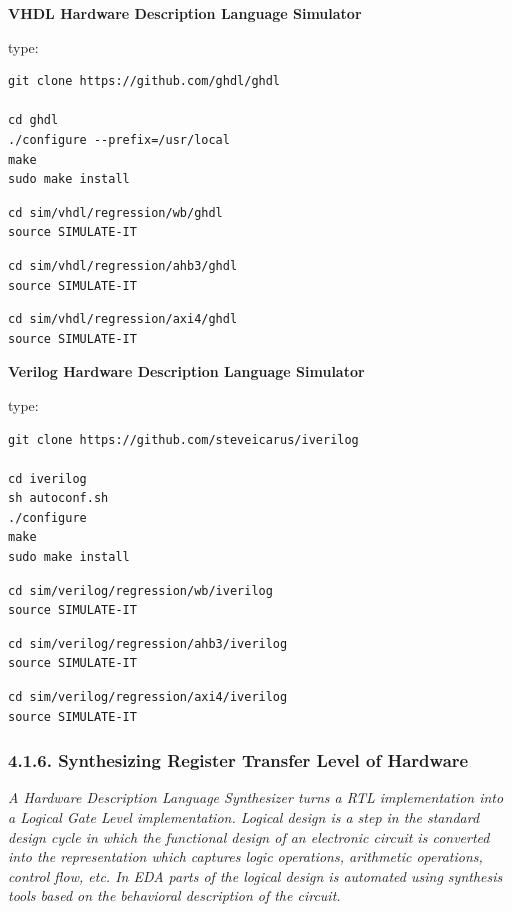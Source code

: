 \documentclass[]{article}
\begin{document}
\textbf{VHDL Hardware Description Language Simulator}

type:

\begin{verbatim}
git clone https://github.com/ghdl/ghdl

cd ghdl
./configure --prefix=/usr/local
make
sudo make install
\end{verbatim}

\begin{verbatim}
cd sim/vhdl/regression/wb/ghdl
source SIMULATE-IT
\end{verbatim}

\begin{verbatim}
cd sim/vhdl/regression/ahb3/ghdl
source SIMULATE-IT
\end{verbatim}

\begin{verbatim}
cd sim/vhdl/regression/axi4/ghdl
source SIMULATE-IT
\end{verbatim}

\textbf{Verilog Hardware Description Language Simulator}

type:

\begin{verbatim}
git clone https://github.com/steveicarus/iverilog

cd iverilog
sh autoconf.sh
./configure
make
sudo make install
\end{verbatim}

\begin{verbatim}
cd sim/verilog/regression/wb/iverilog
source SIMULATE-IT
\end{verbatim}

\begin{verbatim}
cd sim/verilog/regression/ahb3/iverilog
source SIMULATE-IT
\end{verbatim}

\begin{verbatim}
cd sim/verilog/regression/axi4/iverilog
source SIMULATE-IT
\end{verbatim}

\subsubsection{4.1.6. Synthesizing Register Transfer Level of
Hardware}\label{synthesizing-register-transfer-level-of-hardware}

\emph{A Hardware Description Language Synthesizer turns a RTL
implementation into a Logical Gate Level implementation. Logical design
is a step in the standard design cycle in which the functional design of
an electronic circuit is converted into the representation which
captures logic operations, arithmetic operations, control flow, etc. In
EDA parts of the logical design is automated using synthesis tools based
on the behavioral description of the circuit.}
\end{document}
